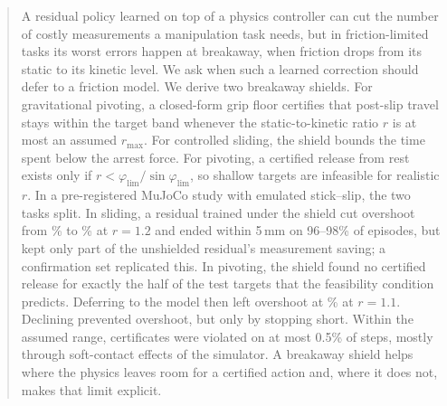 \begin{abstract}
A residual policy learned on top of a physics controller can cut the number of costly measurements a manipulation task needs, but in friction-limited tasks its worst errors happen at breakaway, when friction drops from its static to its kinetic level. We ask when such a learned correction should defer to a friction model. We derive two breakaway shields. For gravitational pivoting, a closed-form grip floor certifies that post-slip travel stays within the target band whenever the static-to-kinetic ratio $r$ is at most an assumed $r_{\max}$. For controlled sliding, the shield bounds the time spent below the arrest force. For pivoting, a certified release from rest exists only if $r<\varphi_{\lim}/\sin\varphi_{\lim}$, so shallow targets are infeasible for realistic $r$. In a pre-registered MuJoCo study with emulated stick--slip, the two tasks split. In sliding, a residual trained under the shield cut overshoot from \% to \% at $r=1.2$ and ended within 5\,mm on 96--98\% of episodes, but kept only part of the unshielded residual's measurement saving; a confirmation set replicated this. In pivoting, the shield found no certified release for exactly the half of the test targets that the feasibility condition predicts. Deferring to the model then left overshoot at \% at $r=1.1$. Declining prevented overshoot, but only by stopping short. Within the assumed range, certificates were violated on at most 0.5\% of steps, mostly through soft-contact effects of the simulator. A breakaway shield helps where the physics leaves room for a certified action and, where it does not, makes that limit explicit.
\end{abstract}
